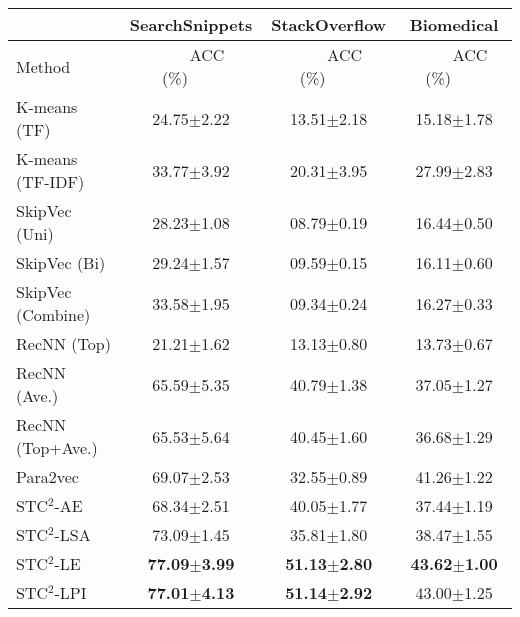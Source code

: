 \documentclass[review]{elsarticle}
\begin{document}
\begin{table*}[t] %
\begin{center}
\begin{tabular}{|l|c|c|c|}\hline
&SearchSnippets &StackOverflow &Biomedical\\\hline
Method     &~~~~ACC (\%)~~~~&~~~~ACC (\%)~~~~&~~~~ACC (\%)~~~~\\\hline \hline
K-means (TF)& 24.75$\pm$2.22        & 13.51$\pm$2.18  & 15.18$\pm$1.78    \\
K-means (TF-IDF)& 33.77$\pm$3.92    & 20.31$\pm$3.95  & 27.99$\pm$2.83 \\
SkipVec (Uni) & 28.23$\pm$1.08           & 08.79$\pm$0.19  & 16.44$\pm$0.50 \\
SkipVec (Bi)  & 29.24$\pm$1.57           & 09.59$\pm$0.15  & 16.11$\pm$0.60 \\
SkipVec (Combine)  & 33.58$\pm$1.95      & 09.34$\pm$0.24  & 16.27$\pm$0.33 \\
RecNN (Top) & 21.21$\pm$1.62     	&13.13$\pm$0.80	  &13.73$\pm$0.67\\
RecNN (Ave.) & 65.59$\pm$5.35		&40.79$\pm$1.38	  &37.05$\pm$1.27\\
RecNN (Top+Ave.) & 65.53$\pm$5.64	&40.45$\pm$1.60	  &36.68$\pm$1.29\\
Para2vec & 69.07$\pm$2.53	&32.55$\pm$0.89	  &41.26$\pm$1.22\\
\hline
STC$^2$-AE& 68.34$\pm$2.51& 40.05$\pm$1.77	  &37.44$\pm$1.19\\
STC$^2$-LSA& 73.09$\pm$1.45	& 35.81$\pm$1.80	   &38.47$\pm$1.55\\
STC$^2$-LE& {\bf{77.09$\pm$3.99}} & {\bf{51.13$\pm$2.80}}	     &{\bf{43.62$\pm$1.00}}\\
STC$^2$-LPI& {\bf{77.01$\pm$4.13}}	& {\bf{51.14$\pm$2.92}}	&43.00$\pm$1.25\\\hline


\end{tabular}
\end{center}
\end{table*}
\end{document}
